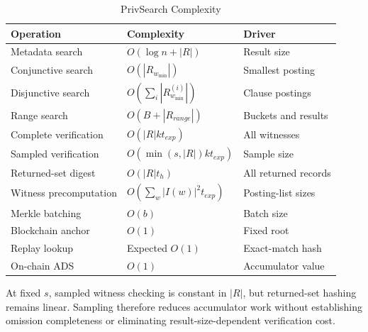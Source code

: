 \documentclass[journal]{IEEEtran}
\theoremstyle{tight}
\theoremstyle{remark}
\theoremstyle{plain}
\begin{document}
\begin{table}[!tb]
\centering
\caption{PrivSearch Complexity}
\label{tab:complexity}
\scriptsize
\setlength{\tabcolsep}{3pt}
\begin{tabular}{p{2.5cm}p{2.3cm}p{1.8cm}}
\toprule
\textbf{Operation} & \textbf{Complexity} & \textbf{Driver} \\
\midrule
Metadata search &
\(O(\log n+|R|)\) &
Result size \\

Conjunctive search &
\(O(|R_{w_{\min}}|)\) &
Smallest posting \\

Disjunctive search &
\(O(\sum_i|R_{w_{\min}}^{(i)}|)\) &
Clause postings \\

Range search &
\(O(B+|R_{range}|)\) &
Buckets and results \\

Complete verification &
\(O(|R|kt_{exp})\) &
All witnesses \\

Sampled verification &
\(O(\min(s,|R|)kt_{exp})\) &
Sample size \\

Returned-set digest &
\(O(|R|t_h)\) &
All returned records \\

Witness precomputation &
\(O(\sum_w|I(w)|^2t_{exp})\) &
Posting-list sizes \\

Merkle batching &
\(O(b)\) &
Batch size \\

Blockchain anchor &
\(O(1)\) &
Fixed root \\

Replay lookup &
Expected \(O(1)\) &
Exact-match hash \\

On-chain ADS &
\(O(1)\) &
Accumulator value \\
\bottomrule
\end{tabular}
\end{table}

At fixed \(s\), sampled witness checking is constant in \(|R|\), but returned-set hashing remains linear. Sampling therefore reduces accumulator work without establishing omission completeness or eliminating result-size-dependent verification cost. 
 
\end{document}
